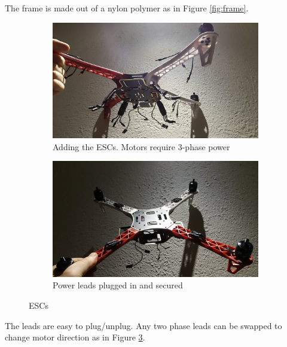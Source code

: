 \noindent
The frame is made out of a nylon polymer as in Figure \ref{fig:frame}.\\

\begin{figure}[H]
\begin{subfigure}{0.5\textwidth}
\centering
\includegraphics[scale=0.1]{images/drone-build-esc-3phaseunconnected.jpg}
\caption{Adding the ESCs. Motors require 3-phase power}
\label{fig:ESCs_uplugged}
\end{subfigure}
\begin{subfigure}{0.5\textwidth}
\centering
\includegraphics[scale=0.1]{images/drone-build-esc-3phaseconnected.jpg}
\caption{Power leads plugged in and secured}
\label{fig:ESCs_plugged}
\end{subfigure}
\caption{ESCs}
\label{fig:ESC}
\end{figure}

\noindent
The leads are easy to plug/unplug. Any two phase leads can be swapped to change motor direction as in Figure \ref{fig:ESC}.\\

